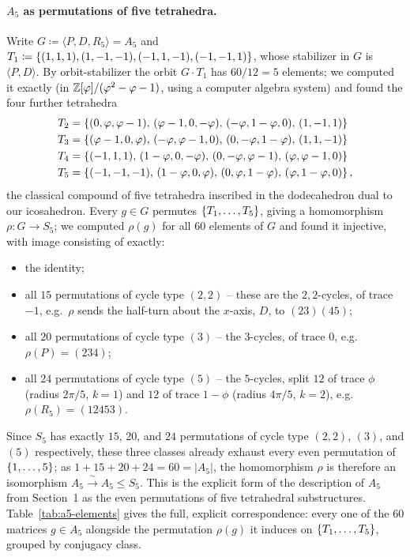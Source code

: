 \documentclass{amsart}
\theoremstyle{plain}
\theoremstyle{definition}
\begin{document}
\paragraph{$A_5$ as permutations of five tetrahedra.} Write $G\coloneqq\langle P,D,R_5\rangle=A_5$ and $T_1\coloneqq\left\{(1,1,1),(1,-1,-1),(-1,1,-1),(-1,-1,1)\right\}$, whose stabilizer in $G$ is $\langle P,D\rangle$. By orbit-stabilizer the orbit $G\cdot T_1$ has $60/12=5$ elements; we computed it exactly (in $\mathbb{Z}[\varphi]/(\varphi^2-\varphi-1)$, using a computer algebra system) and found the four further tetrahedra
\begin{align*}
    T_2 &= \left\{(0,\varphi,\varphi-1),\,(\varphi-1,0,-\varphi),\,(-\varphi,1-\varphi,0),\,(1,-1,1)\right\}\\
    T_3 &= \left\{(\varphi-1,0,\varphi),\,(-\varphi,\varphi-1,0),\,(0,-\varphi,1-\varphi),\,(1,1,-1)\right\}\\
    T_4 &= \left\{(-1,1,1),\,(1-\varphi,0,-\varphi),\,(0,-\varphi,\varphi-1),\,(\varphi,\varphi-1,0)\right\}\\
    T_5 &= \left\{(-1,-1,-1),\,(1-\varphi,0,\varphi),\,(0,\varphi,1-\varphi),\,(\varphi,1-\varphi,0)\right\},
\end{align*}
the classical compound of five tetrahedra inscribed in the dodecahedron dual to our icosahedron. Every $g\in G$ permutes $\left\{T_1,\dots,T_5\right\}$, giving a homomorphism $\rho:G\to S_5$; we computed $\rho(g)$ for all 60 elements of $G$ and found it injective, with image consisting of exactly:
\begin{itemize}
    \item the identity;
    \item all $15$ permutations of cycle type $(2,2)$ -- these are the $2,2$-cycles, of trace $-1$, e.g.\ $\rho$ sends the half-turn about the $x$-axis, $D$, to $(23)(45)$;
    \item all $20$ permutations of cycle type $(3)$ -- the $3$-cycles, of trace $0$, e.g.\ $\rho(P)=(234)$;
    \item all $24$ permutations of cycle type $(5)$ -- the $5$-cycles, split $12$ of trace $\phi$ (radius $2\pi/5$, $k=1$) and $12$ of trace $1-\phi$ (radius $4\pi/5$, $k=2$), e.g.\ $\rho(R_5)=(12453)$.
\end{itemize}
Since $S_5$ has exactly $15$, $20$, and $24$ permutations of cycle type $(2,2)$, $(3)$, and $(5)$ respectively, these three classes already exhaust every even permutation of $\left\{1,\dots,5\right\}$; as $1+15+20+24=60=|A_5|$, the homomorphism $\rho$ is therefore an isomorphism $A_5\xrightarrow{\ \sim\ }A_5\leq S_5$. This is the explicit form of the description of $A_5$ from Section~1 as the even permutations of five tetrahedral substructures. Table~\ref{tab:a5-elements} gives the full, explicit correspondence: every one of the 60 matrices $g\in A_5$ alongside the permutation $\rho(g)$ it induces on $\left\{T_1,\dots,T_5\right\}$, grouped by conjugacy class.
\end{document}
